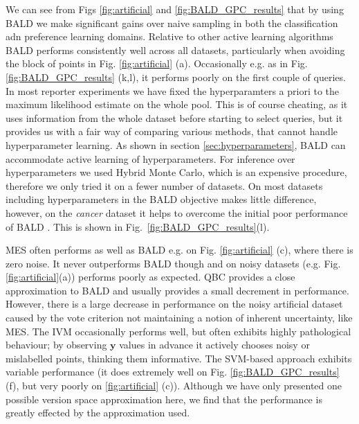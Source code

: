 \documentclass{article}
\newcommand{\y}{\bm{y}}
\newcommand{\ourmethod}{BALD } %
\begin{document}
We can see from Figs \ref{fig:artificial} and \ref{fig:BALD_GPC_results} that by using \ourmethod we make significant gains over naive sampling in both the classification adn preference learning domains. Relative to other active learning algorithms \ourmethod performs consistently well across all datasets, particularly when avoiding the block of points in Fig. \ref{fig:artificial} (a). Occasionally e.g. as in Fig. \ref{fig:BALD_GPC_results} (k,l), it performs poorly on the first couple of queries. In most reporter experiments we have fixed the hyperparamters a priori to the maximum likelihood estimate on the whole pool. This is of course cheating, as it uses information from the whole dataset before starting to select queries, but it provides us with a fair way of comparing various methods, that cannot handle hyperparameter learning. As shown in section \ref{sec:hyperparameters}, BALD can accommodate active learning of hyperparameters. For inference over hyperparameters we used Hybrid Monte Carlo, which is an expensive procedure, therefore we only tried it on a fewer number of datasets. On most datasets including hyperparameters in the \ourmethod objective makes little difference, however, on the \emph{cancer} dataset it helps to overcome the initial poor performance of \ourmethod. This is shown in Fig.\ \ref{fig:BALD_GPC_results}(l).

MES often performs as well as \ourmethod e.g. on Fig. \ref{fig:artificial} (c), where there is zero noise. It never outperforms \ourmethod though and on noisy datasets (e.g. Fig. \ref{fig:artificial}(a)) performs poorly as expected. QBC provides a close approximation to \ourmethod and usually provides a small decrement in performance. However, there is a large decrease in performance on the noisy artificial dataset caused by the vote criterion not maintaining a notion of inherent uncertainty, like MES. The IVM occasionally performs well, but often exhibits highly pathological behaviour; by observing $\y$ values in advance it actively chooses noisy or mislabelled points, thinking them informative. The SVM-based approach exhibits variable performance (it does extremely well on Fig. \ref{fig:BALD_GPC_results} (f), but very poorly on \ref{fig:artificial} (c)). Although we have only presented one possible version space approximation here, we find that the performance is greatly effected by the approximation used.
\end{document}
